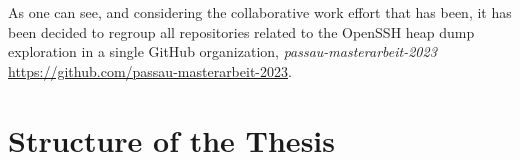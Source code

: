 	As one can see, and considering the collaborative work effort that has been, it has been decided to regroup all repositories related to the OpenSSH heap dump exploration in a single GitHub organization, \textit{passau-masterarbeit-2023} \url{https://github.com/passau-masterarbeit-2023}.

\section{Structure of the Thesis}











\begin{comment}
\section{Example citation \& symbol reference}\label{sec:citation}
For symbols look at \cite{latex_symbols_2017}.


\section{Example reference}
Example reference: Look at chapter~\ref{chap:introduction}, for sections, look at section~\ref{sec:citation}.

\section{Example image}

\begin{figure}
	\centering
	\texttt{[image: uni-logo]}
	\caption{Meaningful caption for this image}
	\label{fig:uniLogo}
\end{figure}

Example figure reference: Look at Figure~\ref{fig:uniLogo} to see an image. It can be \texttt{jpg}, \texttt{png}, or best: \texttt{pdf} (if vector graphic).

\section{Example table}

\begin{table}
	\centering
	\begin{tabular}{lr}
		First column & Number column \\
		\hline
		Accuracy & 0.532 \\
		F1 score & 0.87
	\end{tabular}
	\caption{Meaningful caption for this table}
	\label{tab:result}
\end{table}

Table~\ref{tab:result} shows a simple table\footnote{Check \url{https://en.wikibooks.org/wiki/LaTeX/Tables} on syntax}
\end{comment}


